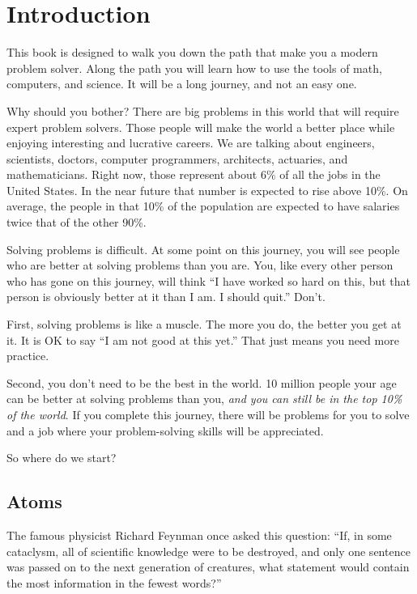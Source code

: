 \chapter{Introduction}

This book is designed to walk you down the path that make you a modern
problem solver. Along the path you will learn how to use the tools of
math, computers, and science. It will be a long journey, and not an
easy one.

Why should you bother? There are big problems in this world that will
require expert problem solvers. Those people will make the world a
better place while enjoying interesting and lucrative careers. We are
talking about engineers, scientists, doctors, computer programmers,
architects, actuaries, and mathematicians. Right now, those represent
about 6\% of all the jobs in the United States. In the near future
that number is expected to rise above 10\%.  On average, the people in
that 10\% of the population are expected to have salaries twice that
of the other 90\%.

Solving problems is difficult. At some point on this journey, you will
see people who are better at solving problems than you are. You, like
every other person who has gone on this journey, will think ``I have
worked so hard on this, but that person is obviously better at it than
I am. I should quit.'' Don't.

First, solving problems is like a muscle. The more you do, the better
you get at it.  It is OK to say ``I am not good at this yet.'' That
just means you need more practice.

Second, you don't need to be the best in the world. 10 million people
your age can be better at solving problems than you, \textit{and you
  can still be in the top 10\% of the world}. If you complete this
journey, there will be problems for you to solve and a job where your
problem-solving skills will be appreciated.

So where do we start?

\section{Atoms}

The famous physicist Richard Feynman once asked this question: ``If,
in some cataclysm, all of scientific knowledge were to be destroyed,
and only one sentence was passed on to the next generation of
creatures, what statement would contain the most information in the
fewest words?''

